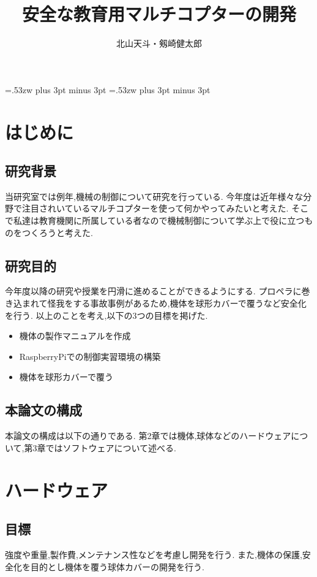 \documentclass[12pt,oneside]{sotsuken_paper}
\title{安全な教育用マルチコプターの開発}
\author{北山天斗・剱崎健太郎}
\begin{document}
\setlength{\baselineskip}{9truemm}

\kanjiskip=.53zw plus 3pt minus 3pt
\xkanjiskip=.53zw plus 3pt minus 3pt

\tableofcontents


\chapter{はじめに}

\section{研究背景}
当研究室では例年,機械の制御について研究を行っている.
今年度は近年様々な分野で注目されいているマルチコプターを使って何かやってみたいと考えた.
そこで私達は教育機関に所属している者なので機械制御について学ぶ上で役に立つものをつくろうと考えた.

\section{研究目的}
今年度以降の研究や授業を円滑に進めることができるようにする.
プロペラに巻き込まれて怪我をする事故事例があるため,機体を球形カバーで覆うなど安全化を行う.
以上のことを考え,以下の3つの目標を掲げた.

\begin{itemize}
	\item 機体の製作マニュアルを作成
	\item RaspberryPiでの制御実習環境の構築
	\item 機体を球形カバーで覆う
\end{itemize}

\section{本論文の構成}
本論文の構成は以下の通りである.
第2章では機体,球体などのハードウェアについて,第3章ではソフトウェアについて述べる.


\chapter{ハードウェア}

\section{目標}
強度や重量,製作費,メンテナンス性などを考慮し開発を行う.
また,機体の保護,安全化を目的とし機体を覆う球体カバーの開発を行う.
\end{document}
